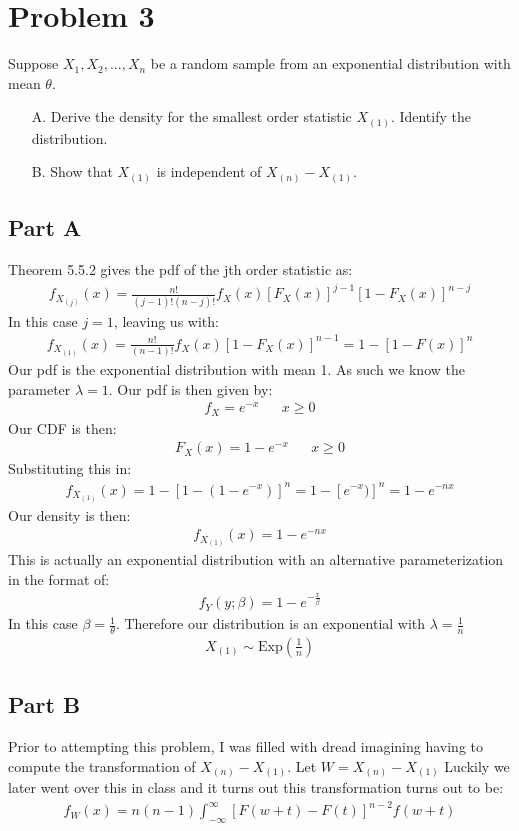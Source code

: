 \documentclass{article}
\begin{document}
\clearpage
\section*{Problem 3}
Suppose $X_1,X_2,...,X_n$ be a random sample from an exponential distribution with mean $\theta$.
\begin{enumerate}
\item[A.] Derive the density for the smallest order statistic $X_{(1)}$. Identify the distribution.
\item[B.] Show that $X_{(1)}$ is independent of $X_{(n)}-X_{(1)}$.
\end{enumerate}
\subsection*{Part A}
Theorem 5.5.2 gives the pdf of the jth order statistic as:
\begin{align*}
f_{X_{(j)}}(x) = \frac{n!}{(j-1)!(n-j)!} f_X(x) [F_X(x)]^{j-1} [1-F_X(x)]^{n-j}
\end{align*}
In this case $j=1$, leaving us with:
\begin{align*}
f_{X_{(1)}}(x) = \frac{n!}{(n-1)!} f_X(x) [1-F_X(x)]^{n-1} = 1-[1-F(x)]^n
\end{align*}
Our pdf is the exponential distribution with mean 1. As such we know the parameter $\lambda=1$. Our pdf is then given by:\begin{align*}
f_X = e^{-x} && x \geq 0
\end{align*}
Our CDF is then:
\begin{align*}
F_X(x) = 1-e^{-x} && x \geq 0
\end{align*}
Substituting this in:
\begin{align*}
f_{X_{(1)}}(x) = 1-[1-(1-e^{-x})]^n = 1-[e^{-x})]^n = 1-e^{-nx}
\end{align*}
Our density is then:
\begin{align*}
f_{X_{(1)}}(x) = 1-e^{-nx}
\end{align*}
This is actually an exponential distribution with an alternative parameterization in the format of:
\begin{align*}
f_Y(y;\beta) = 1-e^{-\tfrac{x}{\beta}}
\end{align*}
In this case $\beta = \tfrac{1}{\theta}$. Therefore our distribution is an exponential with $\lambda=\tfrac{1}{n}$
\begin{align*}
\boxed{ X_{(1)} \sim \text{Exp}(\tfrac{1}{n}) }
\end{align*}
\subsection*{Part B}
Prior to attempting this problem, I was filled with dread imagining having to compute the transformation of $X_{(n)}-X_{(1)}$. Let $W=X_{(n)}-X_{(1)}$ Luckily we later went over this in class and it turns out this transformation turns out to be:
\begin{align*}
f_{W}(x) = n(n-1) \int_{-\infty}^{\infty} [F(w+t)-F(t)]^{n-2} f(w+t)
\end{align*}
\clearpage
\end{document}
